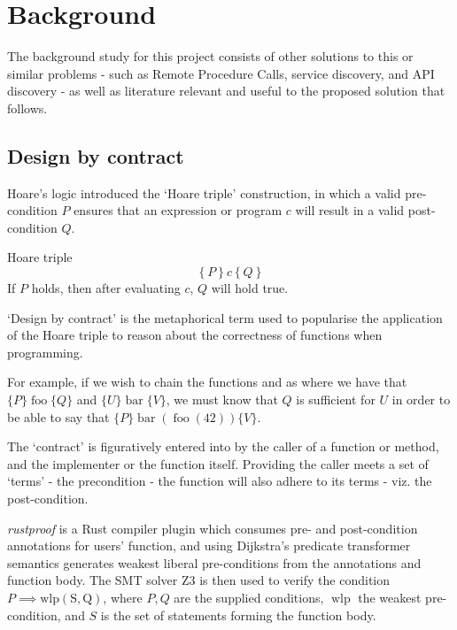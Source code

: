 \section{Background} \label{bg}

The background study for this project consists of other solutions to this or similar problems - such as Remote Procedure Calls, service discovery, and API discovery - as well as literature relevant and useful to the proposed solution that follows.






\subsection{Design by contract} \label{bg:dbc}

Hoare's logic introduced the `Hoare triple' construction, in which a valid pre-condition $P$ ensures that an expression or program $c$ will result in a valid post-condition $Q$. \cite{hoare_logic}

\begin{defn}Hoare triple \label{def:bg:dbc:hoare-triple}
\[
    \left\{P\right\} c \left\{Q\right\}
\] If $P$ holds, then after evaluating $c$, $Q$ will hold true.
\end{defn}

`Design by contract' is the metaphorical term used to popularise the application of the Hoare triple to reason about the correctness of functions when programming.

For example, if we wish to chain the functions  and  as  where we have that $\{P\}\operatorname{foo}\{Q\}$ and $\{U\}\operatorname{bar}\{V\}$, we must know that $Q$ is sufficient for $U$ in order to be able to say that $\{P\} \operatorname{bar}\left(\operatorname{foo}\left(42\right)\right) \{V\}$.

The `contract' is figuratively entered into by the caller of a function or method, and the implementer or the function itself. Providing the caller meets a set of `terms' - the precondition - the function will also adhere to its terms - viz. the post-condition.

\emph{rustproof} is a Rust compiler plugin  which consumes pre- and post-condition annotations for users' function, and using Dijkstra's predicate transformer semantics generates weakest liberal pre-conditions from the annotations and function body. The SMT solver Z3 is then used to verify the condition $P \implies \operatorname{wlp(S, Q)}$, where $P,Q$ are the supplied conditions, $\operatorname{wlp}$ the weakest pre-condition, and $S$ is the set of statements forming the function body. \cite{rust_rustproof}